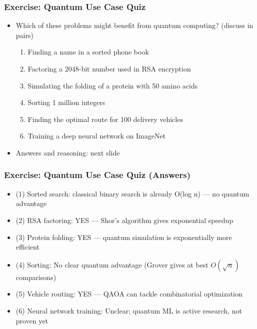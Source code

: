 \begin{frame}[fragile]\frametitle{Exercise: Quantum Use Case Quiz}
\begin{itemize}
\item Which of these problems might benefit from quantum computing? (discuss in pairs)
\begin{enumerate}
\item Finding a name in a sorted phone book
\item Factoring a 2048-bit number used in RSA encryption
\item Simulating the folding of a protein with 50 amino acids
\item Sorting 1 million integers
\item Finding the optimal route for 100 delivery vehicles
\item Training a deep neural network on ImageNet
\end{enumerate}
\item Answers and reasoning: next slide
\end{itemize}
\end{frame}

\begin{frame}[fragile]\frametitle{Exercise: Quantum Use Case Quiz (Answers)}
\begin{itemize}
\item (1) Sorted search: classical binary search is already O(log n) --- no quantum advantage
\item (2) RSA factoring: YES --- Shor's algorithm gives exponential speedup
\item (3) Protein folding: YES --- quantum simulation is exponentially more efficient
\item (4) Sorting: No clear quantum advantage (Grover gives at best $O(\sqrt{n})$ comparisons)
\item (5) Vehicle routing: YES --- QAOA can tackle combinatorial optimization
\item (6) Neural network training: Unclear; quantum ML is active research, not proven yet
\end{itemize}
\end{frame}

